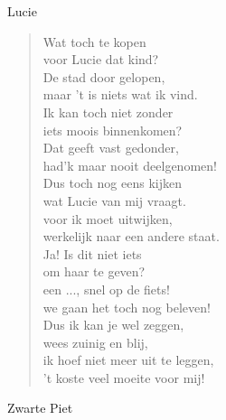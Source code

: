 \documentclass[12pt]{brief}
\date{4 december 2004}
\begin{document}
\begin{letter}{Lucie}

\opening{}


\begin{verse}

Wat toch te kopen\\
voor Lucie dat kind?\\
De stad door gelopen,\\
maar 't is niets wat ik vind.\\[0.5em]

Ik kan toch niet zonder\\
iets moois binnenkomen?\\
Dat geeft vast gedonder,\\
had'k maar nooit deelgenomen!\\[0.5em]

Dus toch nog eens kijken\\
wat Lucie van mij vraagt.\\
voor ik moet uitwijken,\\
werkelijk naar een andere staat.\\[0.5em]

Ja! Is dit niet iets\\
om haar te geven?\\
een ..., snel op de fiets!\\
we gaan het toch nog beleven!\\[0.5em]

Dus ik kan je wel zeggen,\\
wees zuinig en blij,\\
ik hoef niet meer uit te leggen,\\
't koste veel moeite voor mij!\\[0.2em]

\end{verse}


Zwarte Piet


\closing{}

\end{letter}
\end{document}
